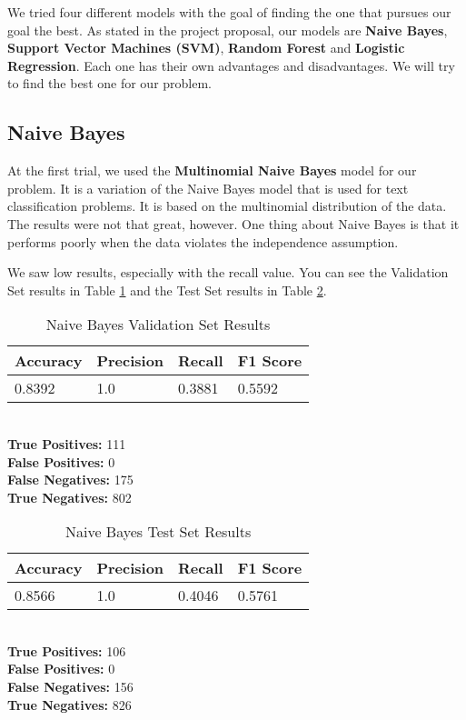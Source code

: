 \documentclass[conference]{IEEEtran}
\begin{document}
We tried four different models with the goal of finding the one that pursues our goal the best. As stated in the project proposal, our models are \textbf{Naive Bayes}, \textbf{Support Vector Machines (SVM)}, \textbf{Random Forest} and \textbf{Logistic Regression}. Each one has their own advantages and disadvantages. We will try to find the best one for our problem.

\subsection{Naive Bayes}
At the first trial, we used the \textbf{Multinomial Naive Bayes} model for our problem. It is a variation of the Naive Bayes model that is used for text classification problems. It is based on the multinomial distribution of the data. The results were not that great, however. One thing about Naive Bayes is that it performs poorly when the data violates the independence assumption.

We saw low results, especially with the recall value. You can see the Validation Set results in Table \ref{tab:nb1} and the Test Set results in Table \ref{tab:nb2}.

\begin{table}[H]
    \caption{Naive Bayes Validation Set Results}

    \begin{tabularx}{\linewidth}{|X|X|X|X|}
        \hline
        \textbf{Accuracy} & \textbf{Precision} & \textbf{Recall} & \textbf{F1 Score} \\
        \hline
        0.8392 & 1.0 & 0.3881 & 0.5592 \\
        \hline
    \end{tabularx}\\

    \textbf{True Positives:} 111\\
    \textbf{False Positives:} 0\\
    \textbf{False Negatives:} 175\\
    \textbf{True Negatives:} 802
    \label{tab:nb1}
\end{table}

\begin{table}[H]
    \caption{Naive Bayes Test Set Results}

    \begin{tabularx}{\linewidth}{|X|X|X|X|}
        \hline
        \textbf{Accuracy} & \textbf{Precision} & \textbf{Recall} & \textbf{F1 Score} \\
        \hline
        0.8566 & 1.0 & 0.4046 & 0.5761 \\
        \hline
    \end{tabularx}\\

    \textbf{True Positives:} 106\\
    \textbf{False Positives:} 0\\
    \textbf{False Negatives:} 156\\
    \textbf{True Negatives:} 826
    \label{tab:nb2}
\end{table}
\end{document}
